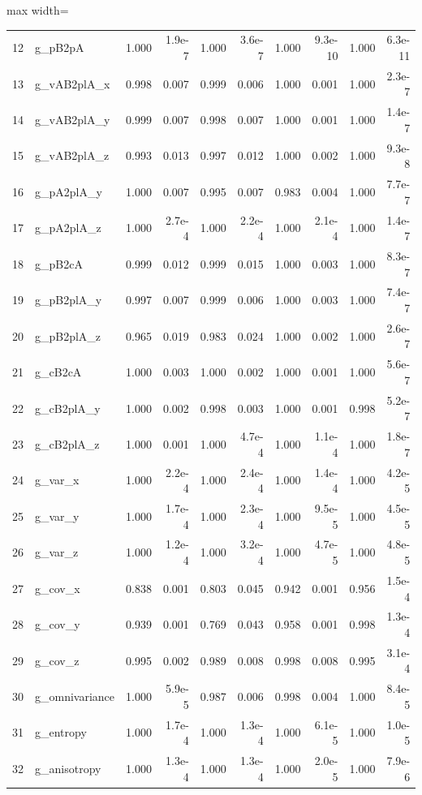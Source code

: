 \documentclass[final,3p,times,twocolumn]{elsarticle}
\begin{document}
\begin{table}[t!]
\begin{adjustbox}{max width=\textwidth}
\begin{tabular}{llrrrrrrrr}
    12 & g\_pB2pA & 1.000 & 1.9e-7 & 1.000 & 3.6e-7 & 1.000 & 9.3e-10 & 1.000 & 6.3e-11 \\
    13 & g\_vAB2plA\_x & 0.998 & 0.007 & 0.999 & 0.006 & 1.000 & 0.001 & 1.000 & 2.3e-7 \\
    14 & g\_vAB2plA\_y & 0.999 & 0.007 & 0.998 & 0.007 & 1.000 & 0.001 & 1.000 & 1.4e-7 \\
    15 & g\_vAB2plA\_z & 0.993 & 0.013 & 0.997 & 0.012 & 1.000 & 0.002 & 1.000 & 9.3e-8 \\
    16 & g\_pA2plA\_y & 1.000 & 0.007 & 0.995 & 0.007 & 0.983 & 0.004 & 1.000 & 7.7e-7 \\
    17 & g\_pA2plA\_z & 1.000 & 2.7e-4 & 1.000 & 2.2e-4 & 1.000 & 2.1e-4 & 1.000 & 1.4e-7 \\
    18 & g\_pB2cA & 0.999 & 0.012 & 0.999 & 0.015 & 1.000 & 0.003 & 1.000 & 8.3e-7 \\
    19 & g\_pB2plA\_y & 0.997 & 0.007 & 0.999 & 0.006 & 1.000 & 0.003 & 1.000 & 7.4e-7 \\
    20 & g\_pB2plA\_z & 0.965 & 0.019 & 0.983 & 0.024 & 1.000 & 0.002 & 1.000 & 2.6e-7 \\
    21 & g\_cB2cA & 1.000 & 0.003 & 1.000 & 0.002 & 1.000 & 0.001 & 1.000 & 5.6e-7 \\
    22 & g\_cB2plA\_y & 1.000 & 0.002 & 0.998 & 0.003 & 1.000 & 0.001 & 0.998 & 5.2e-7 \\
    23 & g\_cB2plA\_z & 1.000 & 0.001 & 1.000 & 4.7e-4 & 1.000 & 1.1e-4 & 1.000 & 1.8e-7 \\
    24 & g\_var\_x & 1.000 & 2.2e-4 & 1.000 & 2.4e-4 & 1.000 & 1.4e-4 & 1.000 & 4.2e-5 \\
    25 & g\_var\_y & 1.000 & 1.7e-4 & 1.000 & 2.3e-4 & 1.000 & 9.5e-5 & 1.000 & 4.5e-5 \\
    26 & g\_var\_z & 1.000 & 1.2e-4 & 1.000 & 3.2e-4 & 1.000 & 4.7e-5 & 1.000 & 4.8e-5 \\
    27 & g\_cov\_x & 0.838 & 0.001 & 0.803 & 0.045 & 0.942 & 0.001 & 0.956 & 1.5e-4 \\
    28 & g\_cov\_y & 0.939 & 0.001 & 0.769 & 0.043 & 0.958 & 0.001 & 0.998 & 1.3e-4 \\
    29 & g\_cov\_z & 0.995 & 0.002 & 0.989 & 0.008 & 0.998 & 0.008 & 0.995 & 3.1e-4 \\
    30 & g\_omnivariance & 1.000 & 5.9e-5 & 0.987 & 0.006 & 0.998 & 0.004 & 1.000 & 8.4e-5 \\
    31 & g\_entropy & 1.000 & 1.7e-4 & 1.000 & 1.3e-4 & 1.000 & 6.1e-5 & 1.000 & 1.0e-5 \\
    32 & g\_anisotropy & 1.000 & 1.3e-4 & 1.000 & 1.3e-4 & 1.000 & 2.0e-5 & 1.000 & 7.9e-6 \\

\end{tabular}
\end{adjustbox}
\end{table}
\end{document}
